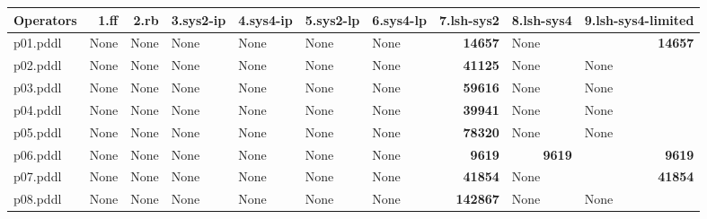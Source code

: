 \documentclass{article}
\begin{document}
\begin{tabular}{@{}lrrrrrrrrr@{}}
Operators & 1.ff & 2.rb & 3.sys2-ip & 4.sys4-ip & 5.sys2-lp & 6.sys4-lp & 7.lsh-sys2 & 8.lsh-sys4 & 9.lsh-sys4-limited \\
\midrule
p01.pddl & \multicolumn{1}{|l|}{None} & \multicolumn{1}{|l|}{None} & \multicolumn{1}{|l|}{None} & \multicolumn{1}{|l|}{None} & \multicolumn{1}{|l|}{None} & \multicolumn{1}{|l|}{None} & \textbf{14657} & \multicolumn{1}{|l|}{None} & \textbf{14657} \\
p02.pddl & \multicolumn{1}{|l|}{None} & \multicolumn{1}{|l|}{None} & \multicolumn{1}{|l|}{None} & \multicolumn{1}{|l|}{None} & \multicolumn{1}{|l|}{None} & \multicolumn{1}{|l|}{None} & \textbf{41125} & \multicolumn{1}{|l|}{None} & \multicolumn{1}{|l|}{None} \\
p03.pddl & \multicolumn{1}{|l|}{None} & \multicolumn{1}{|l|}{None} & \multicolumn{1}{|l|}{None} & \multicolumn{1}{|l|}{None} & \multicolumn{1}{|l|}{None} & \multicolumn{1}{|l|}{None} & \textbf{59616} & \multicolumn{1}{|l|}{None} & \multicolumn{1}{|l|}{None} \\
p04.pddl & \multicolumn{1}{|l|}{None} & \multicolumn{1}{|l|}{None} & \multicolumn{1}{|l|}{None} & \multicolumn{1}{|l|}{None} & \multicolumn{1}{|l|}{None} & \multicolumn{1}{|l|}{None} & \textbf{39941} & \multicolumn{1}{|l|}{None} & \multicolumn{1}{|l|}{None} \\
p05.pddl & \multicolumn{1}{|l|}{None} & \multicolumn{1}{|l|}{None} & \multicolumn{1}{|l|}{None} & \multicolumn{1}{|l|}{None} & \multicolumn{1}{|l|}{None} & \multicolumn{1}{|l|}{None} & \textbf{78320} & \multicolumn{1}{|l|}{None} & \multicolumn{1}{|l|}{None} \\
p06.pddl & \multicolumn{1}{|l|}{None} & \multicolumn{1}{|l|}{None} & \multicolumn{1}{|l|}{None} & \multicolumn{1}{|l|}{None} & \multicolumn{1}{|l|}{None} & \multicolumn{1}{|l|}{None} & \textbf{9619} & \textbf{9619} & \textbf{9619} \\
p07.pddl & \multicolumn{1}{|l|}{None} & \multicolumn{1}{|l|}{None} & \multicolumn{1}{|l|}{None} & \multicolumn{1}{|l|}{None} & \multicolumn{1}{|l|}{None} & \multicolumn{1}{|l|}{None} & \textbf{41854} & \multicolumn{1}{|l|}{None} & \textbf{41854} \\
p08.pddl & \multicolumn{1}{|l|}{None} & \multicolumn{1}{|l|}{None} & \multicolumn{1}{|l|}{None} & \multicolumn{1}{|l|}{None} & \multicolumn{1}{|l|}{None} & \multicolumn{1}{|l|}{None} & \textbf{142867} & \multicolumn{1}{|l|}{None} & \multicolumn{1}{|l|}{None} \\

\end{tabular}
\end{document}
